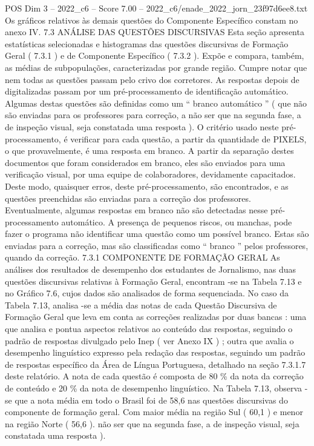 \begin{textsample}{POS Dim 3 – 2022\_c6 – Score 7.00 – 2022\_c6/enade\_2022\_jorn\_23f97d6ee8.txt}
Os gráficos relativos às demais questões do Componente Específico constam no anexo IV. 7.3 ANÁLISE DAS QUESTÕES DISCURSIVAS Esta seção apresenta estatísticas selecionadas e histogramas das questões discursivas de Formação Geral ( 7.3.1 ) e de Componente Específico ( 7.3.2 ).
Expõe e compara, também, as médias de subpopulações, caracterizadas por grande região.
Cumpre notar que nem todas as questões passam pelo crivo dos corretores.
As respostas depois de digitalizadas passam por um pré-processamento de identificação automático.
Algumas destas questões são definidas como um “ branco automático ” ( que não são enviadas para os professores para correção, a não ser que na segunda fase, a de inspeção visual, seja constatada uma resposta ).
O critério usado neste pré-processamento, é verificar para cada questão, a partir da quantidade de PIXELS, o que provavelmente, é uma resposta em branco.
A partir da separação destes documentos que foram considerados em branco, eles são enviados para uma verificação visual, por uma equipe de colaboradores, devidamente capacitados.
Deste modo, quaisquer erros, deste pré-processamento, são encontrados, e as questões preenchidas são enviadas para a correção dos professores.
Eventualmente, algumas respostas em branco não são detectadas nesse pré-processamento automático.
A presença de pequenos riscos, ou manchas, pode fazer o programa não identificar uma questão como um possível branco.
Estas são enviadas para a correção, mas são classificadas como “ branco ” pelos professores, quando da correção. 7.3.1 COMPONENTE DE FORMAÇÃO GERAL As análises dos resultados de desempenho dos estudantes de Jornalismo, nas duas questões discursivas relativas à Formação Geral, encontram -se na Tabela 7.13 e no Gráfico 7.6, cujos dados são analisados de forma sequenciada.
No caso da Tabela 7.13, analisa -se a média das notas de cada Questão Discursiva de Formação Geral que leva em conta as correções realizadas por duas bancas : uma que analisa e pontua aspectos relativos ao conteúdo das respostas, seguindo o padrão de respostas divulgado pelo Inep ( ver Anexo IX ) ; outra que avalia o desempenho linguístico expresso pela redação das respostas, seguindo um padrão de respostas específico da Área de Língua Portuguesa, detalhado na seção 7.3.1.7 deste relatório.
A nota de cada questão é composta de 80 \% da nota da correção de conteúdo e 20 \% da nota de desempenho linguístico.
Na Tabela 7.13, observa -se que a nota média em todo o Brasil foi de 58,6 nas questões discursivas do componente de formação geral.
Com maior média na região Sul ( 60,1 ) e menor na região Norte ( 56,6 ). não ser que na segunda fase, a de inspeção visual, seja constatada uma resposta ).

\end{textsample}
